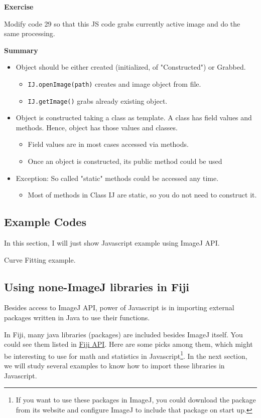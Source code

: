 \documentclass[11pt,a4paper,oneside]{report}
\newenvironment{indentexercise}[1]%
{{\setlength{\leftmargin}{2em}}%
\textbf{Exercise \thesubsection-#1}%
\begin{list}{}%
	\item%
}
{\end{list}}
\newcommand{\ilcom}[1]{\texttt{\small#1}}
\begin{document}
\begin{indentexercise}{1}
Modify code 29 so that this JS code grabs currently active image and do the same processing. 
\end{indentexercise}

\textbf{Summary}
\begin{itemize}
\item Object should be either created (initialized, of "Constructed") or Grabbed. 
\begin{itemize}
\item \ilcom{IJ.openImage(path)} creates and image object from file.
\item \ilcom{IJ.getImage()} grabs already existing object. 
\end{itemize}
\item Object is constructed taking a class as template. A class has field values and methods. Hence, object has those values and classes. 
\begin{itemize}
\item Field values are in most cases accessed via methods.
\item Once an object is constructed, its public method could be used
\end{itemize}
\item Exception: So called "static" methods could be accessed any time. 
\begin{itemize}
\item Most of methods in Class IJ are static, so you do not need to construct
it.
\end{itemize}
\end{itemize}

\subsection{Example Codes}

In this section, I will just show Javascript example using ImageJ API. 

Curve Fitting example. 



\subsection{Using none-ImageJ libraries in Fiji}

Besides access to ImageJ API, power of Javascript is in importing external packages 
written in Java to use their functions.

In Fiji, many java libraries (packages) are included besides ImageJ itself. 
You could see them listed in \href{http://pacific.mpi-cbg.de/javadoc/}{Fiji API}. 
Here are some picks among them, which might be interesting to use for math and statistics 
in Javascript\footnote{ If you want to use these packages in ImageJ, 
you could download the package from its website and configure ImageJ 
to include that package on start up.}. In the next section, 
we will study several examples to know how to import these libraries in Javascript. 
\end{document}
